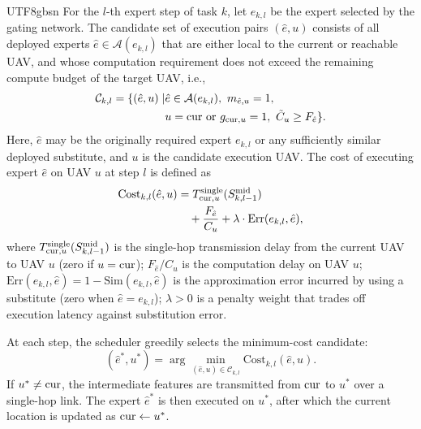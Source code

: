 \documentclass[journal]{IEEEtran}
\begin{document}
\begin{CJK*}{UTF8}{gbsn}
For the \(l\)-th expert step of task \(k\), let \(e_{k,l}\) be the expert selected by the gating network. The candidate set of execution pairs \((\hat{e}, u)\) consists of all deployed experts \(\hat{e} \in \mathcal{A}(e_{k,l})\) that are either local to the current or reachable UAV, and whose computation requirement does not exceed the remaining compute budget of the target UAV, i.e.,
\begin{equation}
\begin{aligned}
\mathcal{C}_{k,l} = \{ (\hat{e}, u) \mid &\hat{e} \in \mathcal{A}(e_{k,l}),\ m_{\hat{e},u}=1, \\
&u = {\rm cur}\ \text{or}\ g_{{\rm cur},u}=1,\ \tilde{C}_u \ge F_{\hat{e}} \}.
\end{aligned}
\end{equation}
Here, \(\hat{e}\) may be the originally required expert \(e_{k,l}\) or any sufficiently similar deployed substitute, and \(u\) is the candidate execution UAV.
The cost of executing expert \(\hat{e}\) on UAV \(u\) at step \(l\) is defined as
\begin{equation}\label{e35}
\begin{aligned}
\mathrm{Cost}_{k,l}(\hat{e}, u) &= T_{{\rm cur},u}^{\mathrm{single}}(S_{k,l-1}^{\mathrm{mid}}) \\
&\quad + \frac{F_{\hat{e}}}{C_u} + \lambda \cdot \mathrm{Err}(e_{k,l}, \hat{e}),
\end{aligned}
\end{equation}
where \(T_{{\rm cur},u}^{\mathrm{single}}(S_{k,l-1}^{\mathrm{mid}})\) is the single-hop transmission delay from the current UAV to UAV \(u\) (zero if \(u = {\rm cur}\)); \(F_{\hat{e}}/C_u\) is the computation delay on UAV \(u\); \(\mathrm{Err}(e_{k,l}, \hat{e}) = 1 - \mathrm{Sim}(e_{k,l}, \hat{e})\) is the approximation error incurred by using a substitute (zero when \(\hat{e} = e_{k,l}\)); \(\lambda > 0\) is a penalty weight that trades off execution latency against substitution error.

At each step, the scheduler greedily selects the minimum-cost candidate:
\begin{equation}
(\hat{e}^*, u^*) = \arg\min_{(\hat{e},u) \in \mathcal{C}_{k,l}} \mathrm{Cost}_{k,l}(\hat{e}, u).
\end{equation}
If \(u^* \neq {\rm cur}\), the intermediate features are transmitted from \({\rm cur}\) to \(u^*\) over a single-hop link. The expert \(\hat{e}^*\) is then executed on \(u^*\), after which the current location is updated as \({\rm cur} \leftarrow u^*\).


\end{CJK*}
\end{document}
